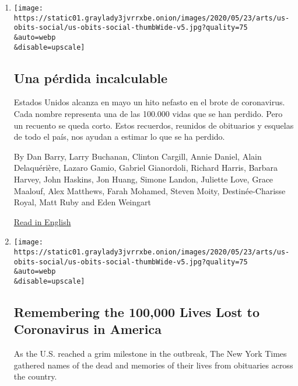 \begin{enumerate}
\def\labelenumi{\arabic{enumi}.}
\item
  \href{/es/2020/05/26/espanol/mundo/100000-victimas-covid-estados-unidos.html}{}

  \texttt{[image: https://static01.graylady3jvrrxbe.onion/images/2020/05/23/arts/us-obits-social/us-obits-social-thumbWide-v5.jpg?quality=75\\\&auto=webp\\\&disable=upscale]}

  \hypertarget{una-puxe9rdida-incalculable}{%
  \subsection{Una pérdida
  incalculable}\label{una-puxe9rdida-incalculable}}

  Estados Unidos alcanza en mayo un hito nefasto en el brote de
  coronavirus. Cada nombre representa una de las 100.000 vidas que se
  han perdido. Pero un recuento se queda corto. Estos recuerdos,
  reunidos de obituarios y esquelas de todo el país, nos ayudan a
  estimar lo que se ha perdido.

  By Dan Barry, Larry Buchanan, Clinton Cargill, Annie Daniel, Alain
  Delaquérière, Lazaro Gamio, Gabriel Gianordoli, Richard Harris,
  Barbara Harvey, John Haskins, Jon Huang, Simone Landon, Juliette Love,
  Grace Maalouf, Alex Matthews, Farah Mohamed, Steven Moity,
  Destinée-Charisse Royal, Matt Ruby and Eden Weingart

  \href{https://www.nytimes3xbfgragh.onion/interactive/2020/05/24/us/us-coronavirus-deaths-100000.html}{Read
  in English}
\item
  \href{/interactive/2020/05/24/us/us-coronavirus-deaths-100000.html}{}

  \texttt{[image: https://static01.graylady3jvrrxbe.onion/images/2020/05/23/arts/us-obits-social/us-obits-social-thumbWide-v5.jpg?quality=75\\\&auto=webp\\\&disable=upscale]}

  \hypertarget{remembering-the-100000-lives-lost-to-coronavirus-in-america}{%
  \subsection{Remembering the 100,000 Lives Lost to Coronavirus in
  America}\label{remembering-the-100000-lives-lost-to-coronavirus-in-america}}

  As the U.S. reached a grim milestone in the outbreak, The New York
  Times gathered names of the dead and memories of their lives from
  obituaries across the country.


\end{enumerate}

